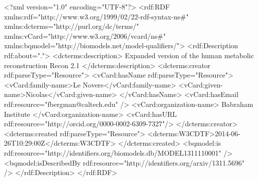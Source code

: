 \begin{example}
<?xml version="1.0" encoding="UTF-8"?>
<rdf:RDF xmlns:rdf="http://www.w3.org/1999/02/22-rdf-syntax-ns#"
         xmlns:dcterms="http://purl.org/dc/terms/"
         xmlns:vCard="http://www.w3.org/2006/vcard/ns#"
         xmlns:bqmodel="http://biomodels.net/model-qualifiers/">
    <rdf:Description rdf:about=".">
        <dcterms:description>
            Expanded version of the human metabolic reconstruction Recon 2.1
        </dcterms:description>
        <dcterms:creator rdf:parseType="Resource">
            <vCard:hasName rdf:parseType="Resource">
                <vCard:family-name>Le Novere</vCard:family-name>
                <vCard:given-name>Nicolas</vCard:given-name>
            </vCard:hasName>
            <vCard:hasEmail rdf:resource="fbergman@caltech.edu" />
            <vCard:organization-name>
                Babraham Institute
            </vCard:organization-name>
            <vCard:hasURL rdf:resource="http://orcid.org/0000-0002-6309-7327"/>
        </dcterms:creator>
        <dcterms:created rdf:parseType="Resource">
            <dcterms:W3CDTF>2014-06-26T10:29:00Z</dcterms:W3CDTF>
        </dcterms:created>
        <bqmodel:is      
             rdf:resource="http://identifiers.org/biomodels.db/MODEL1311110001" />
        <bqmodel:isDescribedBy       
             rdf:resource="http://identifiers.org/arxiv/1311.5696" />
    </rdf:Description>
</rdf:RDF>
\end{example}
